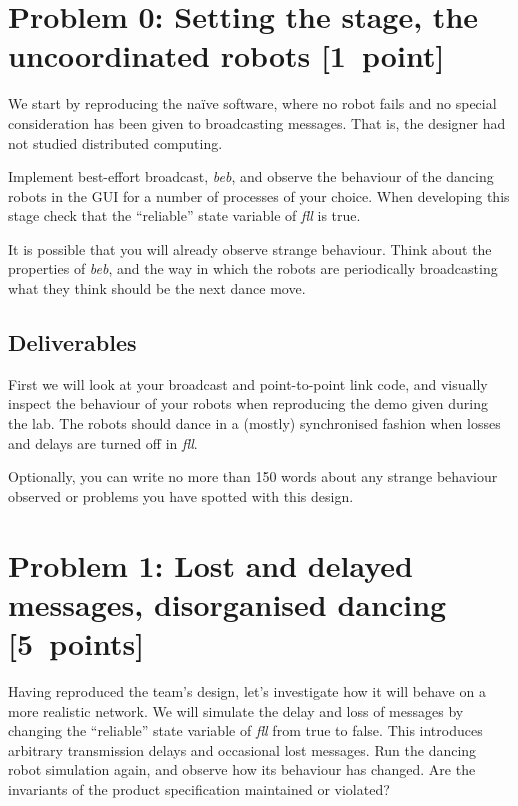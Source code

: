 \documentclass[a4paper]{article}
\begin{document}






\section*{Problem 0: Setting the stage, the uncoordinated robots [1~point]} %
\label{sec:p0}

We start by reproducing the naïve software, where no robot fails and no
special consideration has been given to broadcasting messages. That is, the
designer had not studied distributed computing.

Implement best-effort broadcast, \emph{beb}, and observe the behaviour of the
dancing robots in the GUI for a number of processes of your choice.
When developing this stage check that the ``reliable'' state variable of
\emph{fll} is true.

It is possible that you will already observe strange behaviour. Think about
the properties of \emph{beb}, and the way in which the robots are periodically
broadcasting what they think should be the next dance move.

\subsection*{Deliverables} %
\label{sub:p0_deliverables}

First we will look at your broadcast and point-to-point link code, and
visually inspect the behaviour of your robots when reproducing the demo given
during the lab. The robots should dance in a (mostly) synchronised fashion
when losses and delays are turned off in \emph{fll}.

Optionally, you can write no more than 150 words about any strange behaviour
observed or problems you have spotted with this design.





\section*{Problem 1: Lost and delayed messages, disorganised dancing [5~points]} %
\label{sec:dealing_with_unreliable_links}

Having reproduced the team's design, let's investigate how it will behave on
a more realistic network. We will simulate the delay and loss of messages by
changing the ``reliable'' state variable of \emph{fll} from true to false.
This introduces arbitrary transmission delays and occasional lost messages.
Run the dancing robot  simulation again, and observe how its behaviour has
changed. Are the invariants of the product specification maintained or
violated?
\end{document}
